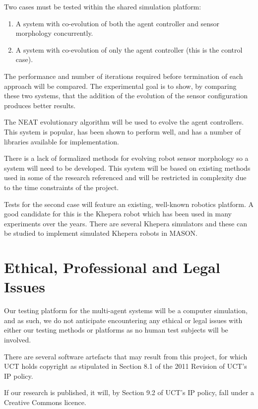 \documentclass[a4paper,12pt]{article}
\begin{document}
Two cases must be tested within the shared simulation platform:
\begin{enumerate}
\item A system with co-evolution of both the agent controller and sensor morphology concurrently.
\item A system with co-evolution of only the agent controller (this is the control case).
\end{enumerate}

The performance and number of iterations required before termination of each approach will be compared. The experimental goal is to show, by comparing these two systems, that the addition of the evolution of the sensor configuration produces better results.

The NEAT evolutionary algorithm will be used to evolve the agent controllers.\cite{Stanley02} This system is popular, has been shown to perform well, and has a number of libraries available for implementation.

There is a lack of formalized methods for evolving robot sensor morphology so a system will need to be developed. This system will be based on existing methods used in some of the research referenced and will be restricted in complexity due to the time constraints of the project.

Tests for the second case will feature an existing, well-known robotics platform. A good candidate for this is the Khepera robot which has been used in many experiments over the years. There are several Khepera simulators and these can be studied to implement simulated Khepera robots in MASON.

\section{Ethical, Professional and Legal Issues}

Our testing platform for the multi-agent systems will be a computer simulation, and as such, we do not anticipate encountering any ethical or legal issues with either our testing methods or platforms as no human test subjects will be involved.

There are several software artefacts that may result from this project, for which UCT holds copyright as stipulated in Section 8.1 of the 2011 Revision of UCT’s IP policy\cite{UCTIP}.

If our research is published, it will, by Section 9.2 of UCT’s IP policy, fall under a Creative Commons licence\cite{UCTIP}.
\end{document}
